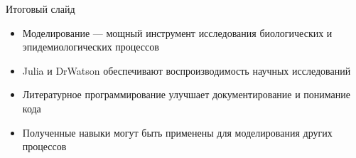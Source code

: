 \documentclass[
  ignorenonframetext,
  aspectratio=169,
  russian,
]{beamer}
\providecommand{\tightlist}{%
  \setlength{\itemsep}{0pt}\setlength{\parskip}{0pt}}\usepackage{longtable,booktabs,array}
\begin{document}
\begin{frame}{Итоговый слайд}
\label{ux438ux442ux43eux433ux43eux432ux44bux439-ux441ux43bux430ux439ux434}
\begin{itemize}[<+->]
\tightlist
\item
  Моделирование --- мощный инструмент исследования биологических и
  эпидемиологических процессов
\item
  Julia и DrWatson обеспечивают воспроизводимость научных исследований
\item
  Литературное программирование улучшает документирование и понимание
  кода
\item
  Полученные навыки могут быть применены для моделирования других
  процессов
\end{itemize}
\end{frame}
\end{document}
